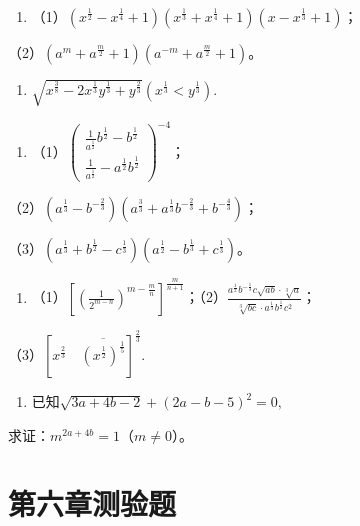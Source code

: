 \begin{enumerate}[start=5]
\item
  （1）\((x^{\frac{1}{2}} - x^{\frac{1}{4}} + 1)(x^{\frac{1}{3}} + x^{\frac{1}{4}} + 1)(x - x^{\frac{1}{3}} + 1)\)；
\end{enumerate}

（2）\((a^{m} + a^{\frac{m}{2}} + 1)(a^{-m} + a^{\frac{m}{2}} + 1)\)。

\begin{enumerate}[start=6]
\item
  \(\sqrt{x^{\frac{3}{8}} - 2x^{\frac{1}{3}}y^{\frac{1}{3}} + y^{\frac{2}{3}}} (x^{\frac{1}{3}} < y^{\frac{1}{3}}).\)
\end{enumerate}

\begin{enumerate}[start=7]
\item
  （1）\(\left( \begin{array}{c} \frac{1}{a^{\frac{1}{2}}} b^{\frac{1}{2}} - b^{\frac{1}{2}} \\ \frac{1}{a^{\frac{1}{2}}} - a^{\frac{1}{2}} b^{\frac{1}{2}} \end{array} \right)^{-4}\)；
\end{enumerate}

（2）\((a^{\frac{1}{3}} - b^{-\frac{2}{3}})(a^{\frac{3}{3}} + a^{\frac{1}{3}}b^{-\frac{2}{3}} + b^{-\frac{4}{3}})\)；

（3）\((a^{\frac{1}{3}} + b^{\frac{1}{2}} - c^{\frac{1}{3}})(a^{\frac{1}{2}} - b^{\frac{1}{3}} + c^{\frac{1}{3}})\)。

\begin{enumerate}[start=8]
\item
  （1）\(\left[\left(\frac{1}{2^{m-n}}\right)^{m-\frac{m}{n}}\right]^{\frac{m}{n+1}}\)；（2）\(\frac{a^{\frac{1}{2}}b^{-\frac{1}{3}}c\sqrt{ab}\cdot\sqrt[3]{a}}{\sqrt[3]{bc}\cdot a^{\frac{1}{3}}b^{\frac{1}{2}}c^2}\)；
\end{enumerate}

（3）\(\left[x^{\frac{2}{3}}\quad \overline{\left(x^{\frac{1}{2}}\right)^{\frac{1}{5}}}\right]^{\frac{2}{3}}.\)

\begin{enumerate}[start=9]
\item
  已知\(\sqrt{3a + 4b - 2} + (2a - b - 5)^2 = 0,\)
\end{enumerate}

求证：\(m^{2a + 4b} = 1\)（\(m\neq 0\)）。

\section{第六章测验题}

